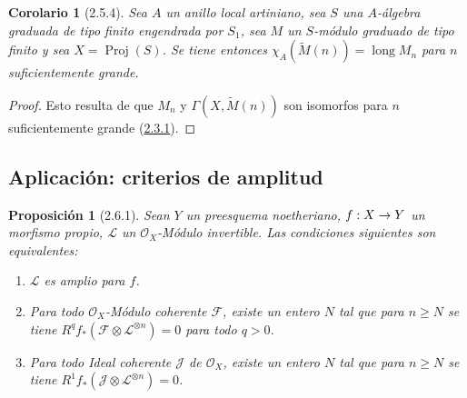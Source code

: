 \documentclass[10pt,oneside,openany]{book}
\theoremstyle{egaenv}\newtheorem*{env}{---}
\theoremstyle{egastatement}
\newtheorem*{proposition}{Proposición}
\newtheorem*{corollary}{Corolario}
\theoremstyle{egadescription}
\renewcommand{\geq}{\geqslant}
\renewcommand{\to}{\mathchoice{\longrightarrow}{\rightarrow}{\rightarrow}{\rightarrow}}
\begin{document}
\begin{corollary}[2.5.4]
\label{III.2.5.4}
\label{III.2.5.4-fr}
Sea $A$ un anillo local artiniano, sea $S$ una $A$-álgebra graduada de tipo finito engendrada por $S_1$, sea $M$ un $S$-módulo graduado de tipo finito y sea
$X=\operatorname{Proj}(S)$. Se tiene entonces
$\chi_A(\widetilde M(n))=\operatorname{long}M_n$
para $n$ suficientemente grande.
\end{corollary}

\begin{proof}
Esto resulta de que $M_n$ y $\Gamma(X,\widetilde M(n))$ son
isomorfos para $n$ suficientemente grande
(\hyperref[III.2.3.1-fr]{2.3.1}).
\end{proof}

\subsection{Aplicación: criterios de amplitud}
\label{subsection:III.2.6-fr}

\begin{proposition}[2.6.1]
\label{III.2.6.1-fr}
Sean $Y$ un preesquema noetheriano, $f:X\to Y$ un morfismo propio,
$\mathcal L$ un $\mathcal O_X$-Módulo invertible. Las condiciones
siguientes son equivalentes:
\begin{enumerate}
\item[\textup{a)}] $\mathcal L$ es amplio para $f$.
\item[\textup{b)}] Para todo $\mathcal O_X$-Módulo coherente $\mathcal F$,
existe un entero $N$ tal que para $n\geq N$ se tiene
$R^qf_*(\mathcal F\otimes\mathcal L^{\otimes n})=0$
para todo $q>0$.
\item[\textup{c)}] Para todo Ideal coherente $\mathcal J$ de $\mathcal O_X$,
existe un entero $N$ tal que para $n\geq N$ se tiene
$R^1f_*(\mathcal J\otimes\mathcal L^{\otimes n})=0$.
\end{enumerate}
\end{proposition}
\end{document}
